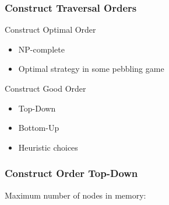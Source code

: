 \documentclass{beamer}
\begin{document}
\begin{frame}

\frametitle{Construct Traversal Orders}

\begin{block}{Construct Optimal Order}

\begin{itemize}

\item NP-complete
\item Optimal strategy in some pebbling game

\end{itemize}

\end{block}

\begin{block}{Construct Good Order}

\begin{itemize}
	\item Top-Down
	\item Bottom-Up
	\item Heuristic choices
\end{itemize}

\end{block}

\end{frame}


\begin{frame}
	\frametitle{Construct Order Top-Down}
	\centering
	Maximum number of nodes in memory:
		 \\[1cm]
	
\end{frame}
\end{document}
